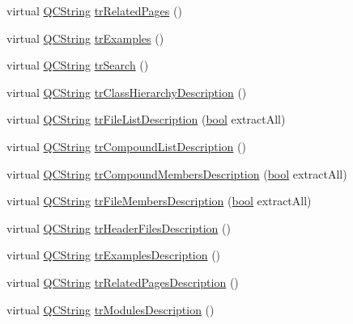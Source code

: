 \begin{DoxyCompactItemize}
\item 
virtual \hyperlink{class_q_c_string}{Q\+C\+String} \hyperlink{class_translator_norwegian_a7cfa9bfcbfb2ab088ae4cfd8d8e57060}{tr\+Related\+Pages} ()
\item 
virtual \hyperlink{class_q_c_string}{Q\+C\+String} \hyperlink{class_translator_norwegian_a809b1833c57839084661bf3e075a43b3}{tr\+Examples} ()
\item 
virtual \hyperlink{class_q_c_string}{Q\+C\+String} \hyperlink{class_translator_norwegian_a7cee2d49aedfd0694f2a8bf96bc49b85}{tr\+Search} ()
\item 
virtual \hyperlink{class_q_c_string}{Q\+C\+String} \hyperlink{class_translator_norwegian_aeaf48ca1671fc1d9877389cdbfffebc6}{tr\+Class\+Hierarchy\+Description} ()
\item 
virtual \hyperlink{class_q_c_string}{Q\+C\+String} \hyperlink{class_translator_norwegian_a4fd299e2c38cf34ed514bb3de01aeaf0}{tr\+File\+List\+Description} (\hyperlink{qglobal_8h_a1062901a7428fdd9c7f180f5e01ea056}{bool} extract\+All)
\item 
virtual \hyperlink{class_q_c_string}{Q\+C\+String} \hyperlink{class_translator_norwegian_a0a70da831e02253a3fd30d785b1a77c2}{tr\+Compound\+List\+Description} ()
\item 
virtual \hyperlink{class_q_c_string}{Q\+C\+String} \hyperlink{class_translator_norwegian_a409423af24454ffed30d2aeab812a9b3}{tr\+Compound\+Members\+Description} (\hyperlink{qglobal_8h_a1062901a7428fdd9c7f180f5e01ea056}{bool} extract\+All)
\item 
virtual \hyperlink{class_q_c_string}{Q\+C\+String} \hyperlink{class_translator_norwegian_ae9fe7a382e392c785e94232bb507f9f6}{tr\+File\+Members\+Description} (\hyperlink{qglobal_8h_a1062901a7428fdd9c7f180f5e01ea056}{bool} extract\+All)
\item 
virtual \hyperlink{class_q_c_string}{Q\+C\+String} \hyperlink{class_translator_norwegian_a02d20eaf0e7a21c70f63b89960167130}{tr\+Header\+Files\+Description} ()
\item 
virtual \hyperlink{class_q_c_string}{Q\+C\+String} \hyperlink{class_translator_norwegian_a3b1e3c1b1bb2c424f52898d3a7317e4f}{tr\+Examples\+Description} ()
\item 
virtual \hyperlink{class_q_c_string}{Q\+C\+String} \hyperlink{class_translator_norwegian_a0bb96adb596a9b6c878033df8b6e270b}{tr\+Related\+Pages\+Description} ()
\item 
virtual \hyperlink{class_q_c_string}{Q\+C\+String} \hyperlink{class_translator_norwegian_adbf4e95c60739c0f92fdcd595f9e6451}{tr\+Modules\+Description} ()

\end{DoxyCompactItemize}

